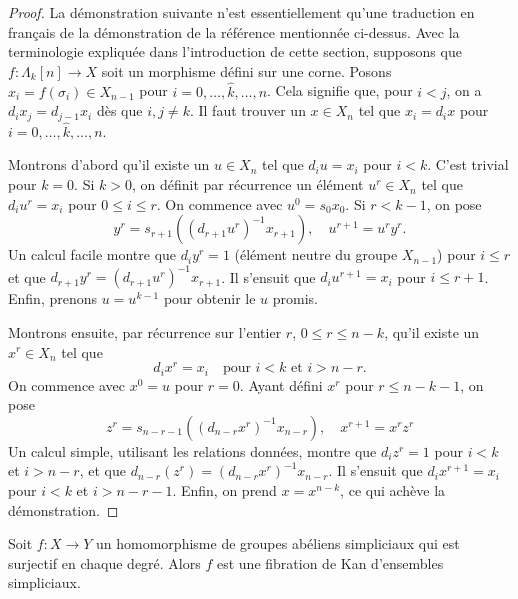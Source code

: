 \begin{proof}
La démonstration suivante n'est essentiellement qu'une traduction en français
de la démonstration de la référence mentionnée ci-dessus.
Avec la terminologie expliquée dans l'introduction de cette section,
supposons que $f : \Lambda_k[n] \to X$ soit un morphisme défini sur une corne. Posons
$x_i = f(\sigma_i) \in X_{n - 1}$ pour $i = 0, \ldots, \hat k, \ldots, n$.
Cela signifie que, pour $i < j$, on a $d_i x_j = d_{j - 1} x_i$
dès que $i, j \not = k$.
Il faut trouver un $x \in X_n$ tel que $x_i = d_ix$ pour
$i = 0, \ldots, \hat k, \ldots, n$.

\medskip\noindent
Montrons d'abord qu'il existe un $u \in X_n$ tel que $d_i u = x_i$
pour $i < k$. C'est trivial pour $k = 0$. Si $k > 0$, on définit par
récurrence un élément $u^r \in X_n$ tel que $d_i u^r = x_i$ pour
$0 \leq i \leq r$. On commence avec $u^0 = s_0x_0$. Si $r < k - 1$,
on pose
$$
y^r = s_{r + 1}((d_{r + 1}u^r)^{-1}x_{r + 1}),\quad
u^{r + 1} = u^r y^r.
$$
Un calcul facile montre que $d_iy^r = 1$ (élément neutre du groupe
$X_{n - 1}$) pour $i \leq r$ et que
$d_{r + 1}y^r = (d_{r + 1}u^r)^{-1}x_{r + 1}$. Il s'ensuit que
$d_iu^{r + 1} = x_i$ pour $i \leq r + 1$. Enfin, prenons $u = u^{k - 1}$
pour obtenir le $u$ promis.

\medskip\noindent
Montrons ensuite, par récurrence sur l'entier $r$, $0 \leq r \leq n - k$,
qu'il existe un $x^r \in X_n$ tel que
$$
d_i x^r = x_i\quad\text{pour }i < k\text{ et }i > n - r.
$$
On commence avec $x^0 = u$ pour $r = 0$. Ayant défini $x^r$ pour
$r \leq n - k - 1$, on pose
$$
z^r = s_{n - r - 1}((d_{n - r}x^r)^{-1}x_{n - r}),\quad x^{r + 1} = x^rz^r
$$
Un calcul simple, utilisant les relations données, montre que
$d_iz^r = 1$ pour $i < k$ et $i > n - r$, et que
$d_{n - r}(z^r) = (d_{n - r}x^r)^{-1}x_{n - r}$. Il s'ensuit que
$d_ix^{r + 1} = x_i$ pour $i < k$ et $i > n - r - 1$. Enfin, on
prend $x = x^{n - k}$, ce qui achève la démonstration.
\end{proof}

\begin{lemma}
\label{lemma-surjection-simplicial-abelian-groups-kan}
Soit $f : X \to Y$ un homomorphisme de groupes abéliens simpliciaux
qui est surjectif en chaque degré. Alors $f$ est une fibration de Kan
d'ensembles simpliciaux.
\end{lemma}

